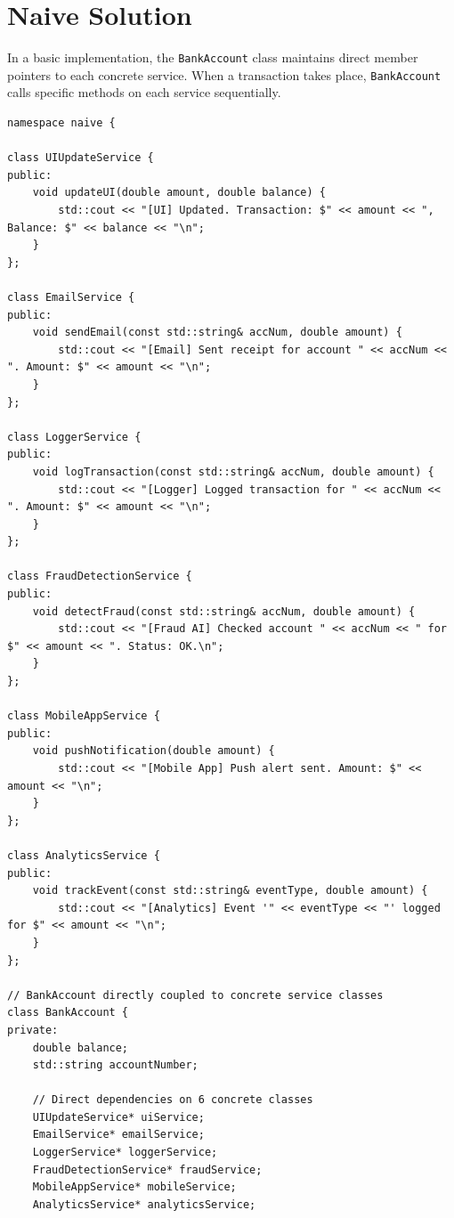 \documentclass[12pt,a4paper]{article}
\begin{document}
\newpage
\section{Naive Solution}

In a basic implementation, the \texttt{BankAccount} class maintains direct member pointers to each concrete service. When a transaction takes place, \texttt{BankAccount} calls specific methods on each service sequentially.

\begin{lstlisting}[caption=Naive Bank Account with Direct Service Coupling (\texttt{naive.cpp})]
namespace naive {

class UIUpdateService {
public:
    void updateUI(double amount, double balance) {
        std::cout << "[UI] Updated. Transaction: $" << amount << ", Balance: $" << balance << "\n";
    }
};

class EmailService {
public:
    void sendEmail(const std::string& accNum, double amount) {
        std::cout << "[Email] Sent receipt for account " << accNum << ". Amount: $" << amount << "\n";
    }
};

class LoggerService {
public:
    void logTransaction(const std::string& accNum, double amount) {
        std::cout << "[Logger] Logged transaction for " << accNum << ". Amount: $" << amount << "\n";
    }
};

class FraudDetectionService {
public:
    void detectFraud(const std::string& accNum, double amount) {
        std::cout << "[Fraud AI] Checked account " << accNum << " for $" << amount << ". Status: OK.\n";
    }
};

class MobileAppService {
public:
    void pushNotification(double amount) {
        std::cout << "[Mobile App] Push alert sent. Amount: $" << amount << "\n";
    }
};

class AnalyticsService {
public:
    void trackEvent(const std::string& eventType, double amount) {
        std::cout << "[Analytics] Event '" << eventType << "' logged for $" << amount << "\n";
    }
};

// BankAccount directly coupled to concrete service classes
class BankAccount {
private:
    double balance;
    std::string accountNumber;
    
    // Direct dependencies on 6 concrete classes
    UIUpdateService* uiService;
    EmailService* emailService;
    LoggerService* loggerService;
    FraudDetectionService* fraudService;
    MobileAppService* mobileService;
    AnalyticsService* analyticsService;


\end{lstlisting}
\end{document}
